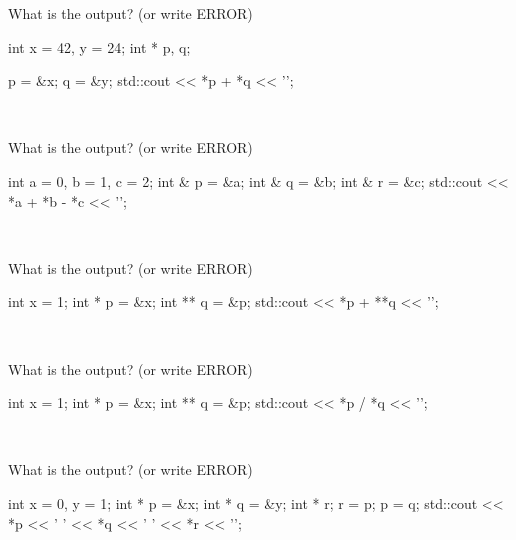 

\nextq
What is the output? (or write ERROR)
\begin{console}[fontsize=\small]
int x = 42, y = 24;
int * p, q;

p = &x;
q = &y;
std::cout << *p + *q << '\n';
\end{console}
\\ \ANSWER
\begin{answercode}

\end{answercode}

\nextq
What is the output? (or write ERROR)
\begin{console}[fontsize=\small]
int a = 0, b = 1, c = 2;
int & p = &a;
int & q = &b;
int & r = &c;
std::cout << *a + *b - *c << '\n';
\end{console}
\\ \ANSWER
\begin{answercode}

\end{answercode}

\nextq
What is the output? (or write ERROR)
\begin{console}[fontsize=\small]
int x = 1;
int * p = &x;
int ** q = &p;
std::cout << *p + **q << '\n';
\end{console}
\\ \ANSWER
\begin{answercode}

\end{answercode}

\nextq
What is the output? (or write ERROR)
\begin{console}[fontsize=\small]
int x = 1;
int * p = &x;
int ** q = &p;
std::cout << *p / *q << '\n';
\end{console}
\\ \ANSWER
\begin{answercode}

\end{answercode}

\nextq
What is the output? (or write ERROR)
\begin{console}[fontsize=\small]
int x = 0, y = 1;
int * p = &x;
int * q = &y;
int * r;
r = p;
p = q;
std::cout << *p << ' ' << *q << ' ' << *r << '\n';
\end{console}
\\ \ANSWER
\begin{answercode}

\end{answercode}

